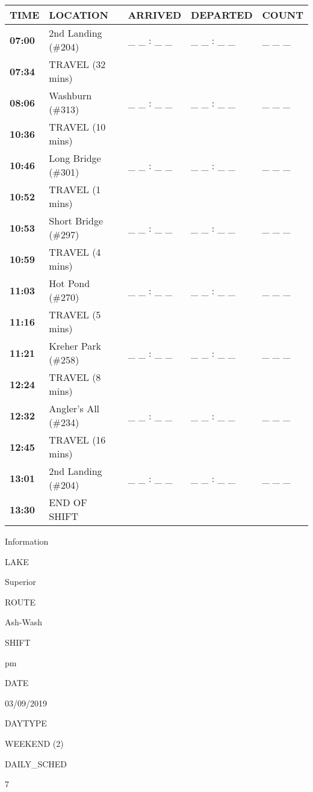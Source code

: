 \documentclass[]{article}
\begin{document}
\begin{tabular}{>{\bfseries}lllll}
\toprule
\textbf{TIME} & \textbf{LOCATION} & \textbf{ARRIVED} & \textbf{DEPARTED} & \textbf{COUNT}\\
\midrule
07:00 & 2nd Landing (\#204) & \_ \_ : \_ \_ & \_ \_ : \_ \_ & \_ \_ \_\\
07:34 & TRAVEL (32 mins) &  &  & \\
08:06 & Washburn (\#313) & \_ \_ : \_ \_ & \_ \_ : \_ \_ & \_ \_ \_\\
10:36 & TRAVEL (10 mins) &  &  & \\
10:46 & Long Bridge (\#301) & \_ \_ : \_ \_ & \_ \_ : \_ \_ & \_ \_ \_\\
10:52 & TRAVEL (1 mins) &  &  & \\
10:53 & Short Bridge (\#297) & \_ \_ : \_ \_ & \_ \_ : \_ \_ & \_ \_ \_\\
10:59 & TRAVEL (4 mins) &  &  & \\
11:03 & Hot Pond (\#270) & \_ \_ : \_ \_ & \_ \_ : \_ \_ & \_ \_ \_\\
11:16 & TRAVEL (5 mins) &  &  & \\
11:21 & Kreher Park (\#258) & \_ \_ : \_ \_ & \_ \_ : \_ \_ & \_ \_ \_\\
12:24 & TRAVEL (8 mins) &  &  & \\
12:32 & Angler's All (\#234) & \_ \_ : \_ \_ & \_ \_ : \_ \_ & \_ \_ \_\\
12:45 & TRAVEL (16 mins) &  &  & \\
13:01 & 2nd Landing (\#204) & \_ \_ : \_ \_ & \_ \_ : \_ \_ & \_ \_ \_\\
13:30 & END OF SHIFT &  &  & \\
\bottomrule
\end{tabular}\newpage

Information

LAKE

Superior

ROUTE

Ash-Wash

SHIFT

pm

DATE

03/09/2019

DAYTYPE

WEEKEND (2)

DAILY\_SCHED

7

\vspace{24pt}
\end{document}
